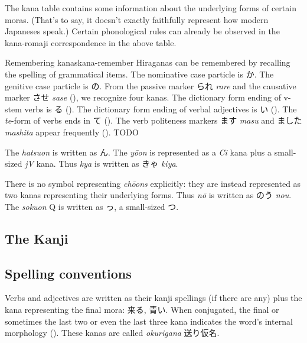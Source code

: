 \documentclass[UTF8, a4paper, oneside, scheme=plain]{ctexrep}
\newcommand*{\term}[1]{\emph{#1}}
\newcommand{\corpus}[1]{\emph{#1}}
\begin{document}
The kana table contains some information about the underlying forms of certain moras.
(That's to say, it doesn't exactly faithfully represent how modern Japaneses speak.)
Certain phonological rules can already be observed in the kana-romaji correspondence in the above table.

\begin{learnbox}{Remembering kanas}{kana-remember}
    Hiraganas can be remembered by recalling the spelling of grammatical items.
    The nominative case particle is か.
    The genitive case particle is の.
    From the passive marker られ \corpus{rare} and the causative marker させ \corpus{sase} 
    (),
    we recognize four kanas.
    The dictionary form ending of v-stem verbs is る ().
    The dictionary form ending of verbal adjectives is い ().
    The \corpus{te}-form of verbs ends in て ().
    The verb politeness markers ます \corpus{masu} and ました \corpus{mashita} appear frequently 
    ().
    TODO
\end{learnbox}

The \corpus{hatsuon} is written as ん. 
The \corpus{y\={o}on} is represented as a \corpus{Ci} kana plus a small-sized \corpus{jV} kana.
Thus \corpus{kya} is written as きゃ \corpus{kiya}.

There is no symbol representing \corpus{ch\={o}ons} explicitly:
they are instead represented as two kanas representing their underlying forms.
Thus \corpus{n\={o}} is written as のう \corpus{nou}.
The \corpus{sokuon} Q is written as っ, a small-sized つ.

\subsection{The Kanji}\label{sec:kanji}


\subsection{Spelling conventions}\label{sec:spelling-conventions}

Verbs and adjectives are written as their kanji spellings (if there are any)
plus the kana representing the final mora:
来る, 青い.
When conjugated, the final or sometimes the last two or even the last three
kana indicates the word's internal morphology (). 
These kanas are called \term{okurigana} 送り仮名.
\end{document}
